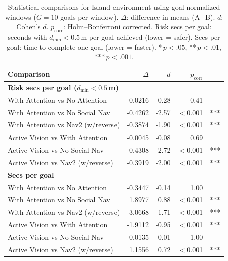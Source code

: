 \begin{table}[h]
\centering
\small
\begin{tabular}{lrrrl}
\toprule
\textbf{Comparison} & \textbf{$\Delta$} & \textbf{$d$} & \textbf{$p_{\mathrm{corr}}$} & \\
\midrule
\multicolumn{5}{l}{\textbf{Risk secs per goal ($d_{\min} < 0.5$\,m)}} \\
\quad With Attention vs No Attention & -0.0216 & -0.28 & 0.41 &  \\
\quad With Attention vs No Social Nav & -0.4262 & -2.57 & $<$0.001 & *** \\
\quad With Attention vs Nav2 (w/reverse) & -0.3874 & -1.90 & $<$0.001 & *** \\
\quad Active Vision vs With Attention & -0.0045 & -0.08 & 0.69 &  \\
\quad Active Vision vs No Social Nav & -0.4308 & -2.72 & $<$0.001 & *** \\
\quad Active Vision vs Nav2 (w/reverse) & -0.3919 & -2.00 & $<$0.001 & *** \\
\midrule
\multicolumn{5}{l}{\textbf{Secs per goal}} \\
\quad With Attention vs No Attention & -0.3447 & -0.14 & 1.00 &  \\
\quad With Attention vs No Social Nav & 1.8977 & 0.88 & $<$0.001 & *** \\
\quad With Attention vs Nav2 (w/reverse) & 3.0668 & 1.71 & $<$0.001 & *** \\
\quad Active Vision vs With Attention & -1.9112 & -0.95 & $<$0.001 & *** \\
\quad Active Vision vs No Social Nav & -0.0135 & -0.01 & 1.00 &  \\
\quad Active Vision vs Nav2 (w/reverse) & 1.1556 & 0.72 & $<$0.001 & *** \\
\bottomrule
\end{tabular}
\caption{Statistical comparisons for Island environment using goal-normalized windows ($G = 10$ goals per window). $\Delta$: difference in means (A$-$B). $d$: Cohen's $d$. $p_{\mathrm{corr}}$: Holm--Bonferroni corrected. Risk secs per goal: seconds with $d_{\min} < 0.5$\,m per goal achieved (lower = safer). Secs per goal: time to complete one goal (lower = faster). *\,$p < .05$, **\,$p < .01$, ***\,$p < .001$.}
\label{tab:stats_island}
\end{table}